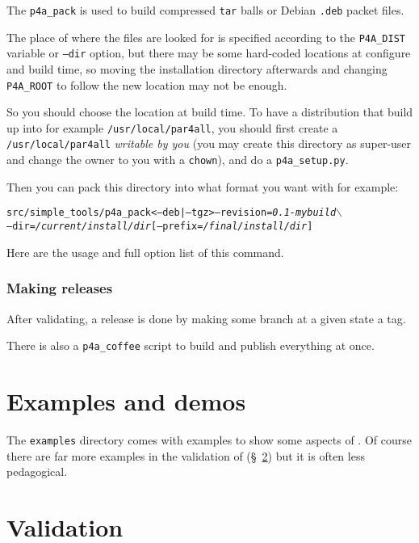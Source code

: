 \documentclass[a4paper]{article}
\begin{document}
The \verb|p4a_pack| is used to build compressed \texttt{tar} balls or Debian
\texttt{.deb} packet files.

The place of where the \Apfa files are looked for is specified according
to the \verb|P4A_DIST| variable or \texttt{--dir} option, but there may be
some hard-coded locations at configure and build time, so moving the
installation directory afterwards and changing \verb|P4A_ROOT| to follow
the new location may not be enough.

So you should choose the location at build time. To have a distribution
that build up into for example \texttt{/usr/local/par4all}, you should
first create a \texttt{/usr/local/par4all} \emph{writable by you} (you may
create this directory as super-user and change the owner to you with a
\texttt{chown}), and do a \verb|p4a_setup.py|.

Then you can pack this directory into what format you want with for
example:
\begin{alltt}
src/simple_tools/p4a_pack <--deb|--tgz> --revision=\emph{0.1-mybuild} \(\backslash\)
  --dir=\emph{/current/install/dir} [--prefix=\emph{/final/install/dir}]
\end{alltt}

Here are the usage and full option list of this command.




\subsubsection{Making releases}
\label{sec:releases}

After validating, a release is done by making some branch at a given state
a tag.

There is also a \verb|p4a_coffee| script to build and publish everything
at once.




\section{Examples and demos}
\label{sec:examples-demos}

The \texttt{examples} directory comes with examples to show some aspects
of \Apfa. Of course there are far more examples in the validation of \Apfa
(\S~\ref{sec:validation}) but it is often less pedagogical.


\section{Validation}
\label{sec:validation}
\end{document}
